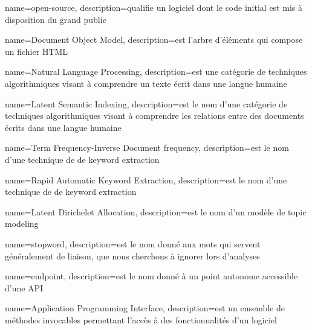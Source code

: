 \makeglossaries

{
	name=open-source,
	description={qualifie un logiciel dont le code initial est mis à disposition du grand public}
}

{
	name={Document Object Model},
	description={est l'arbre d'éléments qui compose un fichier HTML}
}

{
	name={Natural Language Processing},
	description={est une catégorie de techniques algorithmiques visant à comprendre un texte écrit dans une langue humaine}
}

{
	name={Latent Semantic Indexing},
	description={est le nom d'une catégorie de techniques algorithmiques visant à comprendre les relations entre des documents écrits dans une langue humaine}
}

{
	name={Term Frequency-Inverse Document frequency},
	description={est le nom d'une technique de de keyword extraction}
}

{
	name={Rapid Automatic Keyword Extraction},
	description={est le nom d'une technique de de keyword extraction}
}

{
	name={Latent Dirichelet Allocation},
	description={est le nom d'un modèle de topic modeling}
}

{
	name={stopword},
	description={est le nom donné aux mots qui servent généralement de liaison, que nous cherchons à ignorer lors d'analyses}
}

{
	name={endpoint},
	description={est le nom donné à un point autonome accessible d'une API}
}

{
	name={Application Programming Interface},
	description={est un ensemble de méthodes invocables permettant l'accès à des fonctionnalités d'un logiciel}
}
